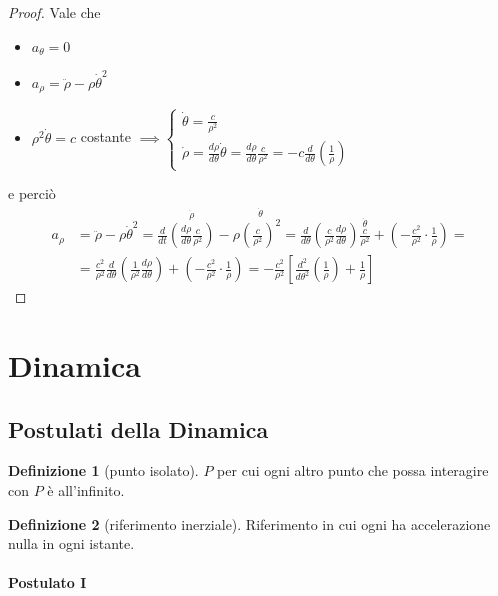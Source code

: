 \documentclass[a4paper,10pt]{article}
\theoremstyle{definition}
\theoremstyle{indentdefinition}
\newtheorem{defn}{Definizione}[section]
\theoremstyle{indenttheorem}
\theoremstyle{myremark}
\theoremstyle{indentgeneral}
\begin{document}
\begin{proof}
Vale che 
\begin{itemize}
    \item $a_{\theta}=0$
    \item $a_{\rho}=\ddot{\rho}-\rho\dot{\theta}^{2}$
    \item  $\rho^{2}\dot{\theta}=c$ costante $\implies \begin{cases}
        \dot{\theta}=\frac{c}{\rho^{2}} \\
        \dot{\rho}=\frac{d\rho}{d\theta}\dot{\theta}=\frac{d\rho}{d\theta}\frac{c}{\rho^{2}}=-c\frac{d}{d\theta}(\frac{1}{\rho})
    \end{cases}$
\end{itemize} 
e perciò
\begin{align*}
a_{\rho} & =\ddot{\rho}-\rho\dot{\theta}^{2}=\frac{d}{dt}\overset{\dot{\rho}}{\left(\boxed{\frac{d\rho}{d\theta}\frac{c}{\rho^{2}}}\right)}-\rho\overset{\dot{\theta}}{\left(\boxed{\frac{c}{\rho^{2}}}\right)^{2}}=\frac{d}{d\theta}\left(\frac{c}{\rho^{2}}\frac{d\rho}{d\theta}\right)\overset{\dot{\theta}}{\boxed{\frac{c}{\rho^{2}}}}+\left(-\frac{c^{2}}{\rho^{2}}\cdot\frac{1}{\rho}\right)=\\
 & =\frac{c^{2}}{\rho^{2}}\frac{d}{d\theta}\left(\frac{1}{\rho^{2}}\frac{d\rho}{d\theta}\right)+\left(-\frac{c^{2}}{\rho^{2}}\cdot\frac{1}{\rho}\right)=-\frac{c^{2}}{\rho^{2}}\left[\frac{d^{2}}{d\theta^{2}}\left(\frac{1}{\rho}\right)+\frac{1}{\rho}\right]
\end{align*}
\end{proof}
\pagebreak{}

\section{Dinamica}
\subsection{Postulati della Dinamica}
\begin{defn}[punto isolato]
\label{def:punto-isolato}$P$ per cui ogni altro punto che possa
interagire con $P$ è all'infinito.
\end{defn}

\begin{defn}[riferimento inerziale]
\label{def:riferimento-inerziale}Riferimento in cui ogni 
ha accelerazione nulla in ogni istante.
\end{defn}


\paragraph{Postulato I\label{par:Postulato-I}}
\end{document}
